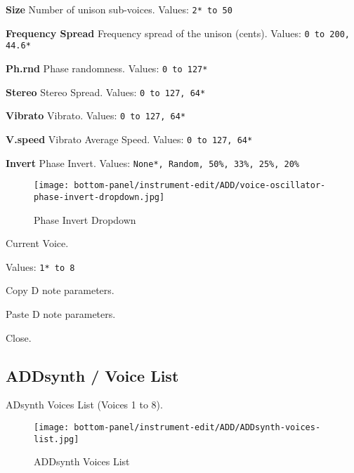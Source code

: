       \begin{enumber}
         \item \textbf{Size}
         Number of unison sub-voices.
         Values: \texttt{2* to 50}
         \item \textbf{Frequency Spread}
         Frequency spread of the unison (cents).
         Values: \texttt{0 to 200, 44.6*}
         \item \textbf{Ph.rnd}
         Phase randomness.
         Values: \texttt{0 to 127*}
         \item \textbf{Stereo}
         Stereo Spread.
         Values: \texttt{0 to 127, 64*}
         \item \textbf{Vibrato}
         Vibrato.
         Values: \texttt{0 to 127, 64*}
         \item \textbf{V.speed}
         Vibrato Average Speed.
         Values: \texttt{0 to 127, 64*}
         \item \textbf{Invert}
         Phase Invert.
         Values: \texttt{None*, Random, 50\%, 33\%, 25\%, 20\%}
      \end{enumber}

\begin{figure}[H]
   \centering 
   \texttt{[image: bottom-panel/instrument-edit/ADD/voice-oscillator-phase-invert-dropdown.jpg]}
   \caption{Phase Invert Dropdown}
   \label{fig:phase_invert_dropdown}
\end{figure}

   Current Voice.

   Values: \texttt{1* to 8}

   Copy D note parameters.

   Paste D note parameters.

   Close.


\subsection{ADDsynth / Voice List}
\label{subsec:addsynth_voice_list}

   ADsynth Voices List (Voices 1 to 8).

\begin{figure}[H]
   \centering 
   \texttt{[image: bottom-panel/instrument-edit/ADD/ADDsynth-voices-list.jpg]}
   \caption{ADDsynth Voices List}
   \label{fig:addsynth_voices_list}
\end{figure}

